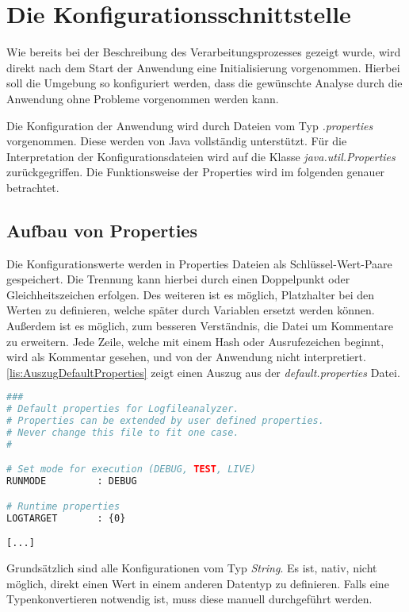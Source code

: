\section{Die Konfigurationsschnittstelle}
Wie bereits bei der Beschreibung des Verarbeitungsprozesses gezeigt wurde, wird direkt nach dem Start der Anwendung eine Initialisierung vorgenommen. Hierbei soll die Umgebung so konfiguriert werden, dass die gewünschte Analyse durch die Anwendung ohne Probleme vorgenommen werden kann.

Die Konfiguration der Anwendung wird durch Dateien vom Typ \textit{.properties} vorgenommen. Diese werden von Java vollständig unterstützt. Für die Interpretation der Konfigurationsdateien wird auf die Klasse \textit{java.util.Properties} zurückgegriffen. Die Funktionsweise der Properties wird im folgenden genauer betrachtet.

\subsection{Aufbau von Properties}
Die Konfigurationswerte werden in Properties Dateien als Schlüssel-Wert-Paare gespeichert. Die Trennung kann hierbei durch einen Doppelpunkt oder Gleichheitszeichen erfolgen. Des weiteren ist es möglich, Platzhalter bei den Werten zu definieren, welche später durch Variablen ersetzt werden können. Außerdem ist es möglich, zum besseren Verständnis, die Datei um Kommentare zu erweitern. Jede Zeile, welche mit einem Hash oder Ausrufezeichen beginnt, wird als Kommentar gesehen, und von der Anwendung nicht interpretiert. \autoref{lis:AuszugDefaultProperties} zeigt einen Auszug aus der \textit{default.properties} Datei. \\

\begin{lstlisting}[language=Bash,caption=Auszug aus default.properties,label=lis:AuszugDefaultProperties]
###
# Default properties for Logfileanalyzer.
# Properties can be extended by user defined properties.
# Never change this file to fit one case.
#

# Set mode for execution (DEBUG, TEST, LIVE)
RUNMODE         : DEBUG

# Runtime properties
LOGTARGET       : {0}

[...]
\end{lstlisting}

Grundsätzlich sind alle Konfigurationen vom Typ \textit{String}. Es ist, nativ, nicht möglich, direkt einen Wert in einem anderen Datentyp zu definieren. Falls eine Typenkonvertieren notwendig ist, muss diese manuell durchgeführt werden.

